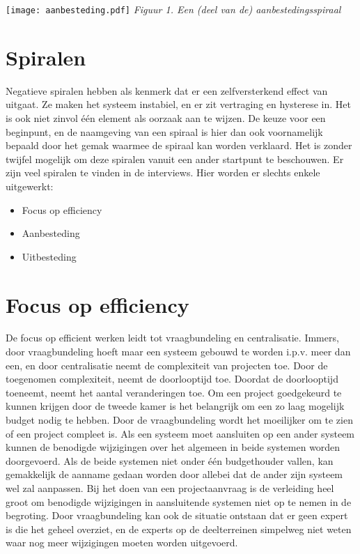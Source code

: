 \documentclass[10pt]{article}   	%
\begin{document}
\begin{multicols}{2}
\texttt{[image: aanbesteding.pdf]}
{\em \center  Figuur 1. Een (deel van de) aanbestedingsspiraal}

\section{Spiralen}
Negatieve spiralen hebben als kenmerk dat er een zelfversterkend
effect van uitgaat. Ze maken het systeem instabiel, en er zit
vertraging en hysterese in. Het is ook niet
zinvol één element als oorzaak aan te wijzen. De keuze voor een beginpunt, en de naamgeving van een 
spiraal is hier dan ook voornamelijk bepaald door het gemak waarmee de spiraal kan worden verklaard.
Het is zonder twijfel mogelijk om deze spiralen vanuit een ander
startpunt te beschouwen. 
Er zijn veel spiralen te vinden in de interviews. Hier worden er slechts enkele uitgewerkt:
\begin{itemize}
\item Focus op efficiency
\item Aanbesteding
\item Uitbesteding
\end{itemize}

\section{Focus op efficiency}

De focus op efficient werken leidt tot vraagbundeling en centralisatie. Immers, door vraagbundeling hoeft
maar een systeem gebouwd te worden i.p.v. meer dan een, en door centralisatie neemt de complexiteit van
projecten toe. Door de toegenomen complexiteit, neemt de doorlooptijd toe. Doordat de doorlooptijd
toeneemt, neemt het aantal veranderingen toe. Om een project goedgekeurd te kunnen krijgen door de tweede
kamer is het belangrijk om een zo laag mogelijk budget nodig te hebben. Door de vraagbundeling wordt het
moeilijker om te zien of een project compleet is. Als een systeem moet aansluiten op een ander systeem
kunnen de benodigde wijzigingen over het algemeen in beide systemen worden doorgevoerd. Als de beide
systemen niet onder één budgethouder vallen, kan gemakkelijk de aanname gedaan worden door allebei dat
de ander zijn systeem wel zal aanpassen. Bij het doen van een projectaanvraag is de verleiding heel groot om
benodigde wijzigingen in aansluitende systemen niet op te nemen in de begroting. Door vraagbundeling 
kan ook de situatie ontstaan dat er geen expert is die het geheel overziet, en de experts op de deelterreinen
simpelweg niet weten waar nog meer wijzigingen moeten worden uitgevoerd.


\end{multicols}
\end{document}
